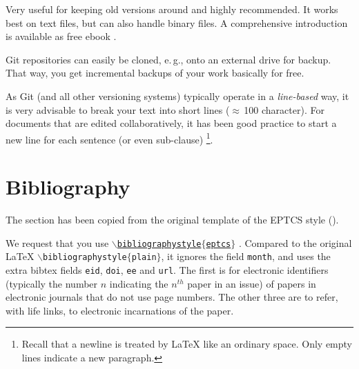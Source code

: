 \documentclass[]{tukseminar}
\begin{document}
\begin{description}
		Very useful for keeping old versions around and highly recommended.
		It works best on text files, but can also handle binary files.
		A comprehensive introduction is available as free ebook \cite{gitbook}.

		Git repositories can easily be cloned, e.\,g., onto an external drive for backup.
		That way, you get incremental backups of your work basically for free.

		As Git (and all other versioning systems) typically operate in a \emph{line-based} way,
		it is very advisable to break your text into short lines ($\approx$\,100 character).
		For documents that are edited collaboratively, it has been good practice to start a new line for each sentence (or even sub-clause)%
		\footnote{%
		  Recall that a newline is treated by \LaTeX{} like an ordinary space.
		  Only empty lines indicate a new paragraph.
		}.

\end{description}


\section{Bibliography}
The section has been copied from the original template of the EPTCS style (\cite{bibliographystylewebpage}).

We request that you use \href{http://eptcs.web.cse.unsw.edu.au/eptcs.bst}{\texttt{$\backslash$bibliographystyle$\{$eptcs$\}$}}
\cite{bibliographystylewebpage}.
Compared to the original {\LaTeX} \texttt{$\backslash$biblio\-graphystyle$\{$plain$\}$}, it ignores the field \texttt{month}, and uses the extra bibtex fields \texttt{eid}, \texttt{doi}, \texttt{ee} and \texttt{url}.
The first is for electronic identifiers (typically the number $n$ indicating the $n^{th}$ paper in an issue) of papers in electronic journals that do not use page numbers.
The other three are to refer, with life links, to electronic incarnations of the paper.
\end{document}
